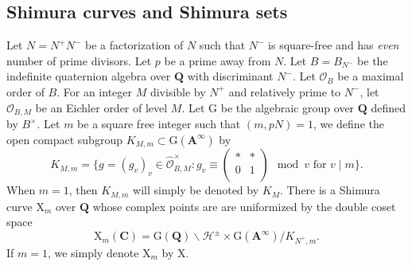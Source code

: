 \documentclass[10pt]{amsart}
\numberwithin{equation}{section}
\theoremstyle{plain}
\numberwithin{equation}{section}
\theoremstyle{definition}
\theoremstyle{remark}
\def\calH{\mathcal{H}}
\def\calO{\mathcal{O}}
\def\Adel{\mathbf{A}}
\def\CC{\mathbf{C}}
\def\QQ{\mathbf{Q}}
\def\rmG{\mathrm{G}}
\def\rmX{\mathrm{X}}
\begin{document}
\subsection{Shimura curves and Shimura sets}
Let $N=N^{+}N^{-}$ be a factorization of $N$ such that $N^{-}$ is square-free and has \emph{even} number of prime divisors. Let $p$ be a prime away from $N$. 
Let $B=B_{N^{-}}$ be the indefinite quaternion algebra over $\QQ$ with discriminant $N^{-}$. Let $\calO_{B}$ be a maximal order of $B$. For an integer $M$ divisible by $N^{+}$ and relatively prime to $N^{-}$, let $\calO_{B, M}$ be an Eichler order of level $M$. Let $\rmG$ be the algebraic group over $\QQ$ defined by $B^{\times}$. Let $m$ be a square free integer such that $(m, pN)=1$, we define the open compact subgroup $K_{M, m}\subset \rmG(\Adel^{\infty})$ by
\begin{equation*}
K_{M, m}= \{g=(g_{v})_{v}\in \widehat{\calO}^{\times}_{B, M}: g_{v}\equiv \begin{pmatrix} \ast & \ast\\ 0& 1\\\end{pmatrix}\mod v \text{ for } v\mid m\}.
\end{equation*}
When $m=1$, then $K_{M, m}$ will simply be denoted by $K_{M}$. There is a Shimura curve $\rmX_{m}$ over $\QQ$ whose complex points are are uniformized by the double coset space
\begin{equation*}
\rmX_{m}(\CC)=\rmG(\QQ)\backslash \calH^{\pm} \times \rmG(\Adel^{\infty})/K_{N^{+},m}.
\end{equation*}
If $m=1$, we simply denote $\rmX_{m}$ by $\rmX$.
\end{document}
